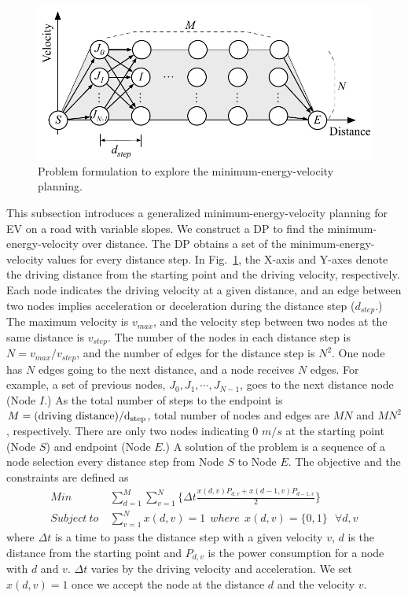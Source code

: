 \documentclass{IEEEtran}
\begin{document}
\begin{figure} [h]%
\center
\includegraphics[width=0.85\hsize]{Figures/Opt_drive_problem.pdf}
\caption{Problem formulation to explore the minimum-energy-velocity planning.}
\label{fig:Opt_drive_problem}
\end{figure}

This subsection introduces a generalized minimum-energy-velocity planning for EV  on a road with variable slopes. We construct a DP to find the minimum-energy-velocity over distance. The DP obtains a set of the minimum-energy-velocity values for every distance step. In Fig.~\ref{fig:Opt_drive_problem}, the X-axis and Y-axes denote the driving distance from the starting point and the driving velocity, respectively. Each node indicates the driving velocity at a given distance, and an edge between two nodes implies acceleration or deceleration during the distance step ($d_{step}$.) The maximum velocity is $v_{max}$, and the velocity step between two nodes at the same distance is $v_{step}$. The number of the nodes in each distance step is $N = v_{max} / v_{step}$, and the number of edges for the distance step is $N^2$. One node has $N$ edges going to the next distance, and a node receives $N$ edges. For example, a set of previous nodes, $J_0, J_1, \cdots, J_{N-1}$, goes to the next distance node (Node $I$.) As the total number of steps to the endpoint is $M = (\rm driving~distance) / d_{step}$, total number of nodes and edges are $MN$ and $MN^2$, respectively. There are only two nodes indicating 0 $m/s$ at the starting point (Node $S$) and endpoint (Node $E$.) A solution of the problem is a sequence of a node selection every distance step from Node $S$ to Node $E$. The objective and the constraints are defined as
%
\begin{align} %
Min ~& \sum_{d=1}^{M}\sum_{v=1}^{N}\{\Delta t \frac{x(d,v)P_{d,v} + x(d-1,v)P_{d-1,v}}{2}\} \label{eq:objective}\\
Subject~to ~& \sum_{v=1}^{N}x(d,v) = 1~~where~~x(d,v) = \{0, 1\} ~~~\forall d, v \nonumber
\end{align}
%
where $\Delta t$ is a time to pass the distance step with a given velocity $v$, $d$ is the distance from the starting point and $P_{d,v}$ is the power consumption for a node with $d$ and $v$. $\Delta t$ varies by the driving velocity and acceleration. We set $x(d,v)=1$ once we accept the node at the distance $d$ and the velocity $v$.
\end{document}
